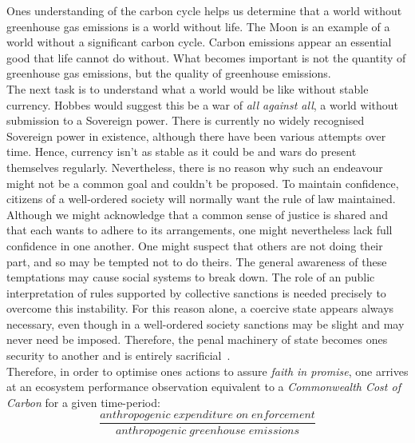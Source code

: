\documentclass[11pt, oneside]{article}   	%
\begin{document}
Ones understanding of the carbon cycle helps us determine that a world without greenhouse gas emissions is a world without life.
The Moon is an example of a world without a significant carbon cycle.
Carbon emissions appear an essential good that life cannot do without.
What becomes important is not the quantity of greenhouse gas emissions, but the quality of greenhouse emissions.\\

The next task is to understand what a world would be like without stable currency.
Hobbes would suggest this be a war of \emph{all against all}, a world without submission to a Sovereign power.
There is currently no widely recognised Sovereign power in existence, although there have been various attempts over time.
Hence, currency isn't as stable as it could be and wars do present themselves regularly.
Nevertheless, there is no reason why such an endeavour might not be a common goal and couldn't be proposed.
To maintain confidence, citizens of a well-ordered society will normally want the rule of law maintained.
Although we might acknowledge that a common sense of justice is shared and that each wants to adhere to its arrangements, one might nevertheless lack full confidence in one another.
One might suspect that others are not doing their part, and so may be tempted not to do theirs.
The general awareness of these temptations may cause social systems to break down.
The role of an public interpretation of rules supported by collective sanctions is needed precisely to overcome this instability.
For this reason alone, a coercive state appears always necessary, even though in a well-ordered society sanctions may be slight and may never need be imposed.
Therefore, the penal machinery of state becomes ones security to another and is entirely sacrificial~\cite{jr1}.\\

Therefore, in order to optimise ones actions to assure \emph{faith in promise}, one arrives at an ecosystem performance observation equivalent to a \emph{Commonwealth Cost of Carbon} for a given time-period:\\

\begin{equation}
	\frac{anthropogenic\; expenditure\; on\; enforcement}{anthropogenic\; greenhouse\; emissions}
\end{equation}
\end{document}
